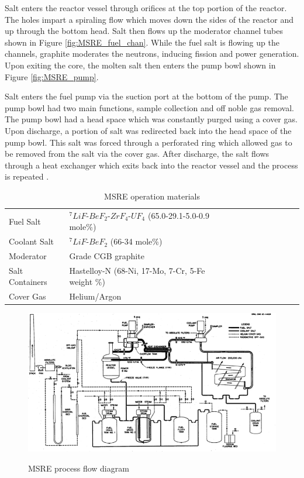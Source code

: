 Salt enters the reactor vessel through orifices at the top portion of the reactor. The holes impart a spiraling flow which moves down the sides of the reactor and up through the bottom head. Salt then flows up the moderator channel tubes shown in Figure \ref{fig:MSRE_fuel_chan}. While the fuel salt is flowing up the channels, graphite moderates the neutrons, inducing fission and power generation. Upon exiting the core, the molten salt then enters the pump bowl shown in Figure \ref{fig:MSRE_pump}. 

Salt enters the fuel pump via the suction port at the bottom of the pump. The pump bowl had two main functions, sample collection and off noble gas removal. The pump bowl had a head space which was constantly purged using a cover gas. Upon discharge, a portion of salt was redirected back into the head space of the pump bowl. This salt was forced through a perforated ring which allowed gas to be removed from the salt via the cover gas. After discharge, the salt flows through a heat exchanger which exits back into the reactor vessel and the process is repeated \cite{engel1970}.

\vspace{12.7mm} %

\begin{table}[htbp!]
   \caption{\label{tab:MSRE_salt} MSRE operation materials}
   \centering
   \begin{tabular}{l llllllllll}
   \hline
   Fuel Salt & ${}^{7}LiF$-$BeF_{2}$-$ZrF_{4}$-$UF_{4}$ (65.0-29.1-5.0-0.9 mole\%) \\ [1ex]
   Coolant Salt & ${}^{7}LiF$-$BeF_{2}$ (66-34 mole\%) \\ [1ex]
   Moderator & Grade CGB graphite \\ [1ex]
   Salt Containers & Hastelloy-N (68-Ni, 17-Mo, 7-Cr, 5-Fe weight \%) \\ [1ex]
   Cover Gas & Helium/Argon \\ [1ex]
   \hline
   \end{tabular}
\end{table}

\newpage

\vspace{12.7mm} %

\begin{figure}[p]
  \centering
  \includegraphics[width=5in]{images/MSRE_flow_diagram.png}\\
  \caption{MSRE process flow diagram}
  \label{fig:MSRE_flow_diagram}
\end{figure} 

